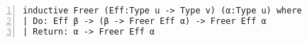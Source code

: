\begin{lstlisting}[language=lean, numbers=left]
inductive Freer (Eff:Type u -> Type v) (α:Type u) where
| Do: Eff β -> (β -> Freer Eff α) -> Freer Eff α
| Return: α -> Freer Eff α
\end{lstlisting}
